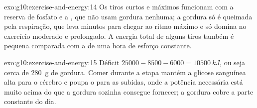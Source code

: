 \begin{solution}{exo:g10:exercise-and-energy:14}
Os tiros curtos e máximos funcionam com a reserva de fosfato e a
, que não usam gordura nenhuma; a gordura só é queimada pela
respiração, que leva minutos para chegar ao ritmo máximo e só domina no
exercício moderado e prolongado. A energia total de alguns tiros
também é pequena comparada com a de uma hora de esforço constante.
\end{solution}

\begin{solution}{exo:g10:exercise-and-energy:15}
Déficit $25000 - 8500 - 6000 = \qty{10500}{kJ}$, ou seja cerca de
\qty{280}{g} de gordura. Comer durante a etapa mantém a glicose
sanguínea alta para o cérebro e poupa o  para as subidas,
onde a potência necessária está muito acima do que a gordura sozinha
consegue fornecer; a gordura cobre a parte constante do dia.
\end{solution}


